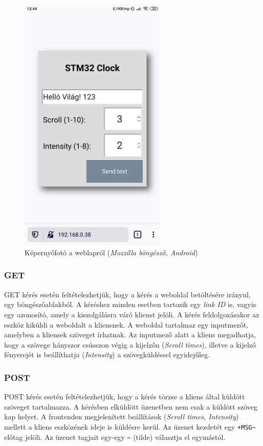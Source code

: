 \documentclass[a4paper, 12pt]{article}
\begin{document}
\begin{figure}[ht]
	\centering
	\includegraphics[width = 7cm]{images/webpage.png}
	\caption{Képernyőfotó a weblapról (\textit{Mozzilla böngésző, Android})}
	\label{fig:webpage}
\end{figure}	

\subsubsection{GET}

GET kérés esetén feltételezhetjük, hogy a kérés a weboldal betöltésére irányul, egy böngészőablakból. A kéréshez minden esetben tartozik egy \textit{link ID} is, vagyis egy azonosító, amely a kiszolgálásra váró klienst jelöli. A kérés feldolgozásakor az eszköz kiküldi a weboldalt a kliensnek. A weboldal tartalmaz egy inputmezőt, amelyben a kliensek szöveget írhatnak. Az inputmező alatt a kliens megadhatja, hogy a szövege hányszor csússzon végig a kijelzőn (\textit{Scroll times}), illetve a kijelző fényerejét is beállíthatja (\textit{Intensity}) a szövegküldéssel egyidejűleg.

\subsubsection{POST}

POST kérés esetén feltételezhetjük, hogy a kérés törzse a kliens által küldött szöveget tartalmazza.
A kérésben elküldött üzenetben nem csak a küldött szöveg kap helyet. A frontenden megjelenített beállítások (\textit{Scroll times, Intensity}) mellett a kliens eszközének ideje is küldésre kerül.
Az üzenet kezdetét egy \texttt{+MSG\~} előtag jelöli. Az üzenet tagjait egy-egy \texttt{\~} (tilde) választja el egymástól.
\end{document}
